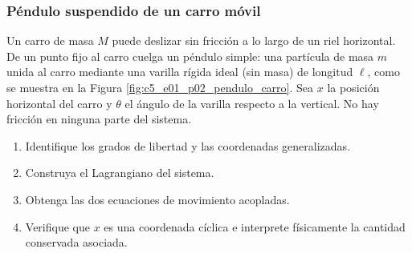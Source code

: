 \subsubsection{Péndulo suspendido de un carro móvil}

Un carro de masa $M$ puede deslizar sin fricción a lo largo de un riel horizontal. De un punto fijo al carro cuelga un péndulo simple: una partícula de masa $m$ unida al carro mediante una varilla rígida ideal (sin masa) de longitud $\ell$, como se muestra en la Figura \ref{fig:c5_e01_p02_pendulo_carro}. Sea $x$ la posición horizontal del carro y $\theta$ el ángulo de la varilla respecto a la vertical. No hay fricción en ninguna parte del sistema.

\begin{enumerate}
    \item Identifique los grados de libertad y las coordenadas generalizadas.
    \item Construya el Lagrangiano del sistema.
    \item Obtenga las dos ecuaciones de movimiento acopladas.
    \item Verifique que $x$ es una coordenada cíclica e interprete físicamente la cantidad conservada asociada.
\end{enumerate}

